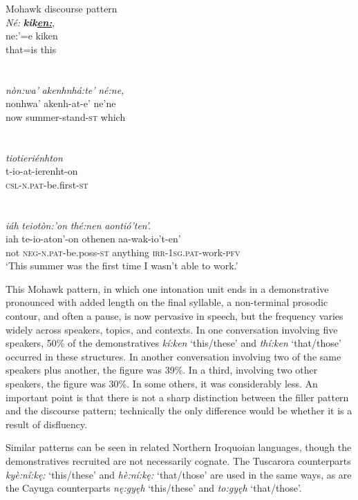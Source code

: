 \documentclass[output=paper]{langscibook}
\begin{document}
\ea%
\label{ex:mithun:20}
Mohawk discourse pattern\\
\glll \textit{Né:} \textbf{\textit{kik\uline{en:}}},\\
    ne:’=e    kiken\\
    that=is  this \\~\\~\\
\glll \textit{nòn:wa’}    \textit{akenhnhá:te’}        \textit{né:ne,}\\
    nonhwa’    akenh-at-e’        ne’ne\\
    now        summer-stand-\textsc{st}    which \\~\\~\\
 \glll \textit{tiotieriénhton} \\
    t-io-at-ierenht-on   \\
    \textsc{csl-n.pat-}be.first-\textsc{st}  \\~\\~\\
\glll \textit{iáh}    \textit{teiotòn:’on} \textit{thé:nen}    \textit{aontió’ten’.}\\
        iah    te-io-aton’-on           othenen    aa-wak-io’t-en’\\
        not  \textsc{neg-n.pat}{}-be.poss-\textsc{st}  anything  \textsc{irr-1sg.pat}{}-work-\textsc{pfv}\\
\glt    ‘This summer was the first time I wasn’t able to work.’   \\  

\z

This Mohawk pattern, in which one intonation unit ends in a demonstrative pronounced with added length on the final syllable, a non-terminal prosodic contour, and often a pause, is now pervasive in speech, but the frequency varies widely across speakers, topics, and contexts. In one conversation involving five speakers, 50\% of the demonstratives \textit{kí:ken} ‘this/these’ and \textit{thí:ken} ‘that/those’ occurred in these structures. In another conversation involving two of the same speakers plus another, the figure was 39\%. In a third, involving two other speakers, the figure was 30\%. In some others, it was considerably less. An important point is that there is not a sharp distinction between the filler pattern and the discourse pattern; technically the only difference would be whether it is a result of disfluency.

Similar patterns can be seen in related Northern Iroquoian languages, though the demonstratives recruited are not necessarily cognate. The Tuscarora counterparts \textit{kyè:ní:kę:} ‘this/these’ and \textit{hè:ní:kę:} ‘that/those’ are used in the same ways, as are the Cayuga counterparts \textit{nę:gyęh} ‘this/these’ and \textit{to:gyęh} ‘that/those’.
\end{document}
